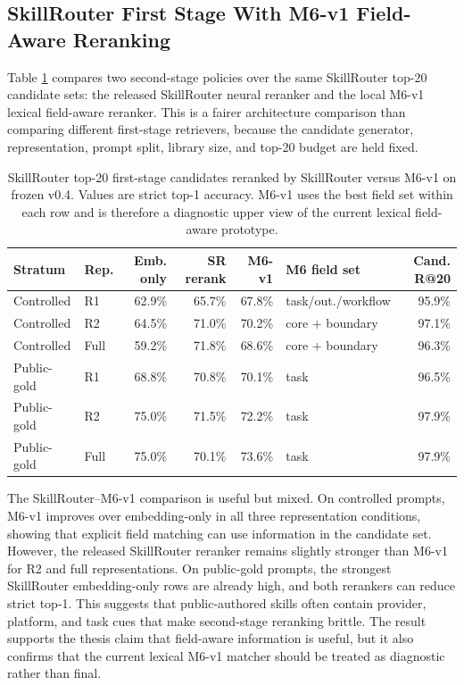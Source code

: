 \subsection{SkillRouter First Stage With M6-v1 Field-Aware Reranking}

Table \ref{tab:skillrouter-m6v1-v04} compares two second-stage policies over the same SkillRouter top-20 candidate sets: the released SkillRouter neural reranker and the local M6-v1 lexical field-aware reranker. This is a fairer architecture comparison than comparing different first-stage retrievers, because the candidate generator, representation, prompt split, library size, and top-20 budget are held fixed.

\begin{table}[h]
\centering
\scriptsize
\begin{tabular}{p{}p{}rrrp{}r}
\toprule
Stratum & Rep. & Emb. only & SR rerank & M6-v1 & M6 field set & Cand. R@20 \\
\midrule
Controlled & R1 & 62.9\% & 65.7\% & 67.8\% & task/out./workflow & 95.9\% \\
Controlled & R2 & 64.5\% & 71.0\% & 70.2\% & core + boundary & 97.1\% \\
Controlled & Full & 59.2\% & 71.8\% & 68.6\% & core + boundary & 96.3\% \\
\midrule
Public-gold & R1 & 68.8\% & 70.8\% & 70.1\% & task & 96.5\% \\
Public-gold & R2 & 75.0\% & 71.5\% & 72.2\% & task & 97.9\% \\
Public-gold & Full & 75.0\% & 70.1\% & 73.6\% & task & 97.9\% \\
\bottomrule
\end{tabular}
\caption{SkillRouter top-20 first-stage candidates reranked by SkillRouter versus M6-v1 on frozen v0.4. Values are strict top-1 accuracy. M6-v1 uses the best field set within each row and is therefore a diagnostic upper view of the current lexical field-aware prototype.}
\label{tab:skillrouter-m6v1-v04}
\end{table}

The SkillRouter--M6-v1 comparison is useful but mixed. On controlled prompts, M6-v1 improves over embedding-only in all three representation conditions, showing that explicit field matching can use information in the candidate set. However, the released SkillRouter reranker remains slightly stronger than M6-v1 for R2 and full representations. On public-gold prompts, the strongest SkillRouter embedding-only rows are already high, and both rerankers can reduce strict top-1. This suggests that public-authored skills often contain provider, platform, and task cues that make second-stage reranking brittle. The result supports the thesis claim that field-aware information is useful, but it also confirms that the current lexical M6-v1 matcher should be treated as diagnostic rather than final.

